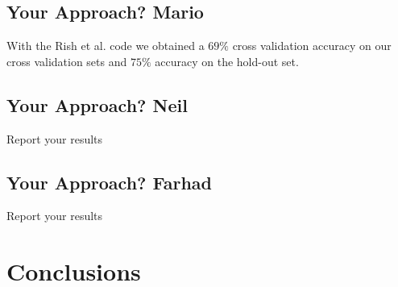 \documentclass{article} %
\begin{document}
\subsection{Your Approach? Mario}
With the Rish et al. code we obtained a $ 69\%$ cross validation accuracy on our cross validation sets and $75 \%$ accuracy on the hold-out set.

\subsection{Your Approach? Neil}
Report your results

\subsection{Your Approach? Farhad}
Report your results

\section{Conclusions}





	
\end{document}
